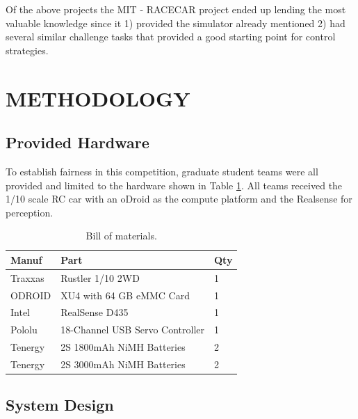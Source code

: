\documentclass[letterpaper, 10 pt, conference]{ieeeconf}  %
\begin{document}
Of the above projects the MIT - RACECAR project ended up lending the most valuable knowledge since it 1) provided the simulator already mentioned 2) had several similar challenge tasks that provided a good starting point for control strategies. 

\section{METHODOLOGY}

\subsection{Provided Hardware}
To establish fairness in this competition, graduate student teams were all provided and limited to the hardware shown in Table \ref{table:1}. All teams received the 1/10 scale RC car with an oDroid as the compute platform and the Realsense for perception.

\begin{table}[h!]
\begin{center}
\caption{Bill of materials.}
\begin{tabular}{ p{1.2cm} p{5.0cm} p{0.4cm} }
 \hline
 Manuf      &   Part                            &   Qty \\
 \hline
 Traxxas    &   Rustler 1/10 2WD                &   1\\
 ODROID     &   XU4 with 64 GB eMMC Card        &   1\\
 Intel      &   RealSense D435                  &   1\\
 Pololu     &   18-Channel USB Servo Controller &   1\\
 Tenergy    &   2S 1800mAh NiMH Batteries       &   2\\
 Tenergy    &   2S 3000mAh NiMH Batteries       &   2\\
 \hline
\end{tabular}
\label{table:1}
\end{center}
\end{table}

\subsection{System Design}
\end{document}
